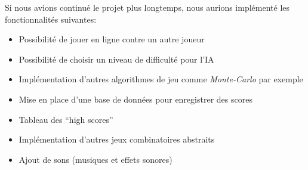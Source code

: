 Si nous avions continué le projet plus longtemps, nous aurions implémenté les fonctionnalités suivantes:

\begin{itemize}
    \item Possibilité de jouer en ligne contre un autre joueur
    \item Possibilité de choisir un niveau de difficulté pour l'IA
    \item Implémentation d'autres algorithmes de jeu comme \emph{Monte-Carlo} par exemple
    \item Mise en place d'une base de données pour enregistrer des scores
    \item Tableau des ``high scores''
    \item Implémentation d'autres jeux combinatoires abstraits
    \item Ajout de sons (musiques et effets sonores)
\end{itemize}
